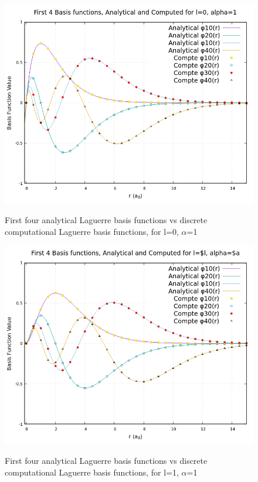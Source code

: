 \documentclass{article}
\begin{document}
    \begin{figure}[H]
    	\centering
    	\includegraphics[scale=0.62]{Images/l0a1.png}\\
    	\caption{First four analytical Laguerre basis functions vs discrete computational Laguerre basis functions, for l=0, $\alpha$=1}
    	\label{l0a1}
    \end{figure}
    \begin{figure}[H]
    	\centering
    	\includegraphics[scale=0.62]{Images/l1a1.png}\\
    	\caption{First four analytical Laguerre basis functions vs discrete computational Laguerre basis functions, for l=1, $\alpha$=1}
    	\label{l1a1}
    \end{figure}
\end{document}

